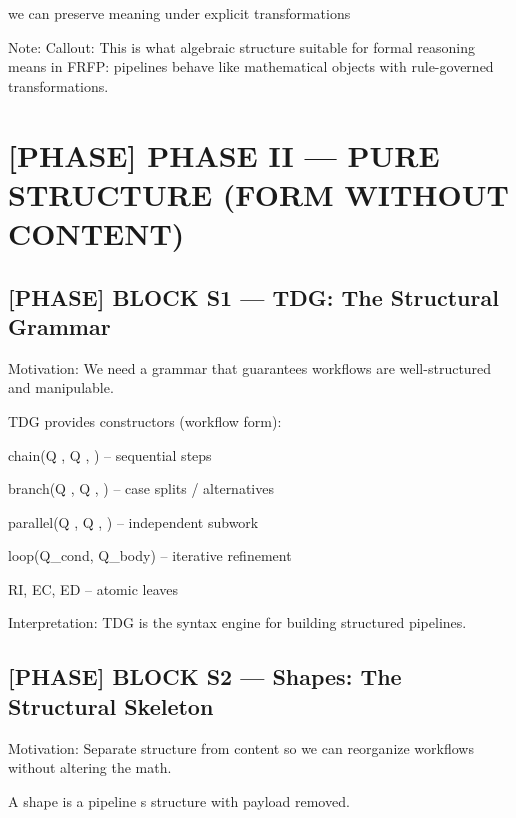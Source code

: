 we can preserve meaning under explicit transformations\par

Note: Callout: This is what algebraic structure suitable for formal reasoning means in FRFP: pipelines behave like mathematical objects with rule-governed transformations.\par

\section*{[PHASE] PHASE II --- PURE STRUCTURE (FORM WITHOUT CONTENT)}

\subsection*{[PHASE] BLOCK S1 --- TDG: The Structural Grammar}

Motivation: We need a grammar that guarantees workflows are well-structured and manipulable.\par

TDG provides constructors (workflow form):\par

chain(Q , Q , ) -- sequential steps\par

branch(Q , Q , ) -- case splits / alternatives\par

parallel(Q , Q , ) -- independent subwork\par

loop(Q\_cond, Q\_body) -- iterative refinement\par

RI, EC, ED -- atomic leaves\par

 Interpretation: TDG is the syntax engine for building structured pipelines.\par

\subsection*{[PHASE] BLOCK S2 --- Shapes: The Structural Skeleton}

Motivation: Separate structure from content so we can reorganize workflows without altering the math.\par

A shape is a pipeline s structure with payload removed.\par

